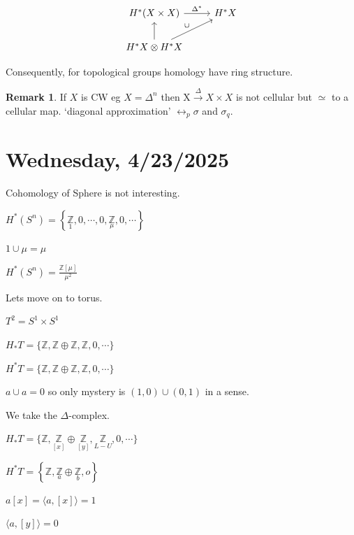 \documentclass{article}
\theoremstyle{definition}
\newtheorem*{remark}{Remark}
\begin{document}
    \[
        \begin{tikzcd}
            H^{\ast} (X \times X) \ar[r,"\Delta^{\ast}"] & H^{\ast} X \\ H^{\ast} X \otimes H^{\ast} X \ar[u] \ar[ru, "\cup"]
        \end{tikzcd}
    \]

    Consequently, for topological groups homology have ring structure.

    \begin{remark}
        If \(X\) is CW eg \(X = \Delta^n\) then X\( \xrightarrow{\Delta} X \times X\) is not cellular but \(\simeq\) to a cellular map. `diagonal approximation' \(\leftrightarrow _p \sigma\) and \(\sigma_q\). 
    \end{remark}

    \section*{Wednesday, 4/23/2025}
    
    Cohomology of Sphere is not interesting.

    \(H^{\ast} (S^n) = \left\{ \underset{1}{\mathbb{Z}}, 0, \cdots , 0, \underset{\mu}{\mathbb{Z}}, 0, \cdots \right\}\) 

    \(1 \cup \mu = \mu\) 

    \(H^{\ast} (S^n) = \frac{\mathbb{Z}[\mu]}{\mu^2}\)

    Lets move on to torus.

    \(T^2 = S^1 \times S^1\) 

    \(H_{\ast} T = \{ \mathbb{Z} , \mathbb{Z} \oplus \mathbb{Z} , \mathbb{Z} , 0, \cdots \} \) 

    \(H^{\ast} T = \{ \mathbb{Z} , \mathbb{Z} \oplus \mathbb{Z} , \mathbb{Z} , 0, \cdots  \} \) 

    \(a \cup a = 0\) so only mystery is \((1,0)\cup (0,1)\) in a sense.

    We take the \(\Delta\)-complex.


    \(H_{\ast} T = \{ \mathbb{Z} , \underset{[x]}{\mathbb{Z}} \oplus \underset{[y]}{\mathbb{Z}}, \underset{L-U}{\mathbb{Z}}, 0, \cdots\}\)
    
    \(H^{\ast} T = \left\{ \mathbb{Z}, \underset{a}{\mathbb{Z}} \oplus \underset{b}{\mathbb{Z}}, o \right\} \) 

    \(a[x] = \langle a, [x] \rangle = 1\) 

    \(\langle a, [y] \rangle = 0\) 
\end{document}
